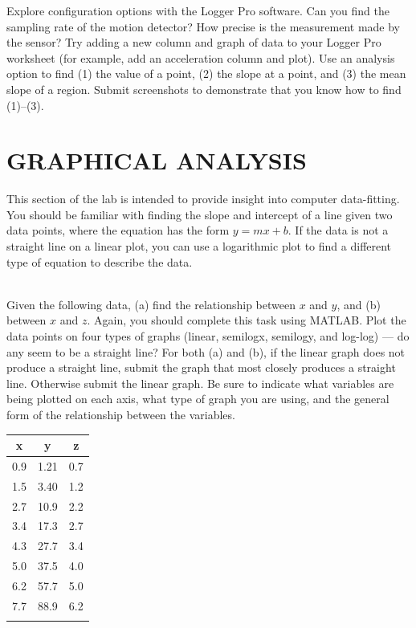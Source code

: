 \documentclass[11pt,letterpaper]{article}
\newcounter{question}[section]
\begin{document}
\question{} Explore configuration options with the Logger Pro software.
Can you find the sampling rate of the motion detector? How precise is the measurement made by the sensor? Try adding a new column and graph of data to your Logger Pro worksheet (for example, add an acceleration column and plot).  Use an analysis option
to find (1) the value of a point, (2) the slope at a point, and (3) the mean slope of a region. Submit screenshots to demonstrate that you know how to find (1)--(3).


\section{GRAPHICAL ANALYSIS}
This section of the lab is intended to provide insight into computer data-fitting.  You should be familiar with finding the slope and intercept of a line given two data points, where the equation has the form $y=mx+b$.  If the data is not a straight line on a linear plot, you can use a logarithmic plot to find a different type of equation to describe the data.

\\ 
Given the following data, (a) find the relationship between $x$ and $y$, and (b) between $x$ and $z$.  Again, you should complete this task using MATLAB.  Plot the data points on four types of graphs (linear, semilogx, semilogy, and log-log) --- do any seem to be a straight line? For both (a) and (b), if the linear graph does not produce a straight line, submit the graph that most closely produces a straight line. Otherwise submit the linear graph. Be sure to indicate what variables are being plotted on each axis, what type of graph you are using, and the general form of the relationship between the variables. 

\begin{tabular}{ccc}
x & y & z\\
\hline
0.9 & 1.21 & 0.7\\
1.5 & 3.40 & 1.2\\
2.7 & 10.9 & 2.2\\
3.4 & 17.3 & 2.7\\
4.3 & 27.7 & 3.4\\
5.0 & 37.5 & 4.0\\
6.2 & 57.7 & 5.0\\
7.7 & 88.9 & 6.2\\
\hline\\
\end{tabular}
\vspace{.5cm}
\end{document}
